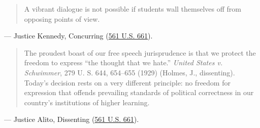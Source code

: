 \documentclass[12pt]{article}
\begin{document}
\begin{quote}
A vibrant dialogue is not possible if students wall themselves off from opposing points of view.
\end{quote}
\noindent --- Justice Kennedy, Concurring (\href{https://supreme.justia.com/cases/federal/us/561/661/}{561 U.S. 661}).

\begin{quote}
The proudest boast of our free speech jurisprudence is that we protect the freedom to express ``the thought that we hate.'' \textit{United States v. Schwimmer}, 279 U. S. 644, 654--655 (1929) (Holmes, J., dissenting). Today's decision rests on a very different principle: no freedom for expression that offends prevailing standards of political correctness in our country's institutions of higher learning.
\end{quote}
\noindent --- Justice Alito, Dissenting (\href{https://www.law.cornell.edu/supct/html/08-1371.ZD.html}{561 U.S. 661}).
\end{document}
